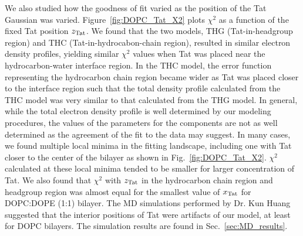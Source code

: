 We also studied how the goodness of fit varied as the position of 
the Tat Gaussian was varied. Figure~\ref{fig:DOPC_Tat_X2} plots $\chi^2$ as a 
function of the fixed Tat position $z_\textrm{Tat}$. We found that the two models,
THG (Tat-in-headgroup region) and THC (Tat-in-hydrocabon-chain region), resulted 
in similar electron density profiles, yielding similar $\chi^2$ values 
when Tat was placed near the hydrocarbon-water interface region. In the THC model, 
the error function representing the hydrocarbon chain region became wider as
Tat was placed closer to the interface region such that 
the total density profile calculated from the THC model was very similar to that calculated 
from the THG model.
In general, while the total electron density profile is well determined by 
our modeling procedures, the values of the parameters for the components are 
not as well determined as the agreement of the fit to the data may suggest. 
In many cases, we found multiple local minima in the fitting landscape, 
including one with Tat closer to the center of the bilayer as
shown in Fig.~\ref{fig:DOPC_Tat_X2}. $\chi^2$ calculated at these local minima 
tended to be smaller for larger concentration of Tat. We also found
that $\chi^2$ with $z_\textrm{Tat}$ in the hydrocarbon chain region and headgroup
region was almost equal for the smallest value of $x_\textrm{Tat}$ for DOPC:DOPE (1:1)
bilayer.
The MD simulations performed by Dr. Kun Huang suggested that
the interior positions of Tat were artifacts of our model, at least for DOPC
bilayers. The simulation results are found in Sec.~\ref{sec:MD_results}.


